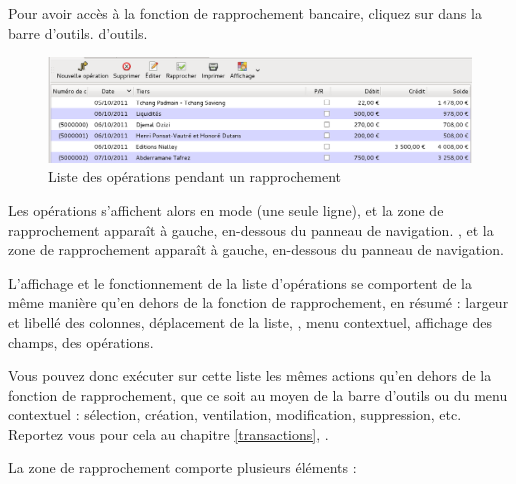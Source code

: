 Pour avoir accès à la fonction de rapprochement bancaire, cliquez sur  dans la barre \ifIllustration d'outils.
\else d'outils.
\fi

\ifIllustration
\begin{figure}[htbp]
\begin{center}
\includegraphics[scale=0.5]{image/screenshot/reconciliation_list}
\end{center}
\caption{Liste des opérations pendant un rapprochement}
\label{reconciliation-list-img}
\end{figure}
\fi

Les opérations s'affichent alors en mode  (une seule ligne)\ifIllustration {}, et la zone de rapprochement apparaît à gauche, en-dessous du panneau de navigation.
\else , et la zone de rapprochement apparaît à gauche, en-dessous du panneau de navigation.
\fi

L'affichage et le fonctionnement de la liste d'opérations se comportent de la même manière qu'en dehors de la fonction de rapprochement, en résumé : largeur et libellé des colonnes, déplacement de la liste, , menu contextuel, affichage des champs,  des opérations.

Vous pouvez donc exécuter sur cette liste les mêmes actions qu'en dehors de la fonction de rapprochement, que ce soit au moyen de la barre d'outils ou du menu contextuel : sélection, création, ventilation, modification, suppression, etc. Reportez vous pour cela au chapitre \vref{transactions}, .


La zone de rapprochement comporte plusieurs éléments :

